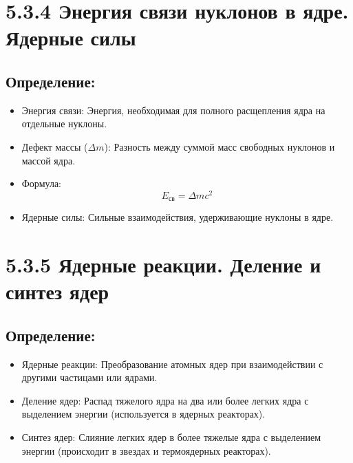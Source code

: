 \documentclass[a4paper,12pt]{article}
\begin{document}
\section*{5.3.4 Энергия связи нуклонов в ядре. Ядерные силы}
\vspace{-9pt}
\subsection*{Определение:}
\vspace{-3pt}
\begin{itemize}[itemsep=0pt, topsep=0pt, parsep=3pt]
    \item Энергия связи: Энергия, необходимая для полного расщепления ядра на отдельные нуклоны.
    \item Дефект массы ($\Delta m$): Разность между суммой масс свободных нуклонов и массой ядра.
    \item Формула:
     \vspace{-0.05em}
    $$ E_{св} = \Delta mc^2 $$
    \item Ядерные силы: Сильные взаимодействия, удерживающие нуклоны в ядре.
\end{itemize}

\section*{5.3.5 Ядерные реакции. Деление и синтез ядер}
\vspace{-9pt}
\subsection*{Определение:}
\vspace{-3pt}
\begin{itemize}[itemsep=0pt, topsep=0pt, parsep=3pt]
    \item Ядерные реакции: Преобразование атомных ядер при взаимодействии с другими частицами или ядрами.
    \item Деление ядер: Распад тяжелого ядра на два или более легких ядра с выделением энергии (используется в ядерных реакторах).
    \item Синтез ядер: Слияние легких ядер в более тяжелые ядра с выделением энергии (происходит в звездах и термоядерных реакторах).
\end{itemize}
\end{document}
